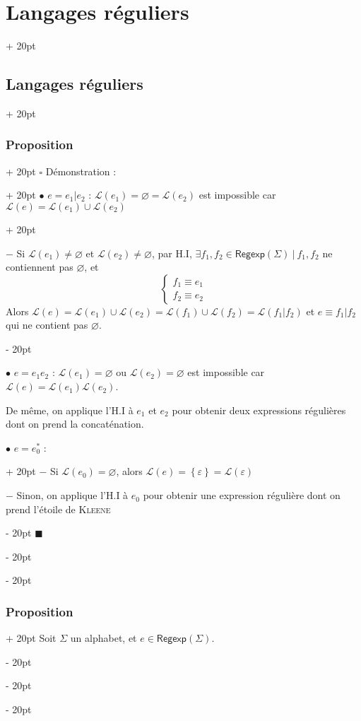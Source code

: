 \documentclass[a4paper, 12pt, twoside]{article}
\newcommand{\set}[1]{\left\{ #1 \right\}}
\newcommand{\ind}[1][20pt]{\advance\leftskip + #1}
\newcommand{\deind}[1][20pt]{\advance\leftskip - #1}
\newenvironment{indt}[2][20pt]{#2 \par \ind[#1]}{\par \deind} %
\newenvironment{proof}[1][{Démonstration :}]{\begin{indt}{$\square$ #1}}{$\blacksquare$ \end{indt}}
\newcommand{\Regexp}{\mathsf{Regexp}}
\begin{document}
\begin{indt}{\section{Langages réguliers}}
\begin{indt}{\subsection{Langages réguliers}}
\begin{indt}{\subsubsection{Proposition}}
\begin{proof}
\begin{indt}{$\bullet$ $e = e_1 | e_2$ : $\mathcal L(e_1) = \varnothing = \mathcal L(e_2)$ est impossible car $\mathcal L(e) = \mathcal L(e_1) \cup \mathcal L(e_2)$}
                        \vspace{12pt}
                        
                        $-$ Si $\mathcal L(e_1) \neq \varnothing$ et $\mathcal L(e_2) \neq \varnothing$, par H.I, $\exists f_1, f_2 \in \Regexp(\Sigma)\ |\ f_1, f_2$ ne contiennent pas $\varnothing$, et
                        \[
                            \begin{cases}
                                f_1 \equiv e_1
                                \\
                                f_2 \equiv e_2
                            \end{cases}
                        \]
                        Alors $\mathcal L(e) = \mathcal L(e_1) \cup \mathcal L(e_2) = \mathcal L(f_1) \cup \mathcal L(f_2) = \mathcal L(f_1 | f_2)$
                        et $e \equiv f_1 | f_2$ qui ne contient pas $\varnothing$.
                    \end{indt}

                    \vspace{6pt}
                    
                    $\bullet$ $e = e_1 e_2$ : $\mathcal L(e_1) = \varnothing$ ou $\mathcal L(e_2) = \varnothing$ est impossible car $\mathcal L(e) = \mathcal L(e_1) \mathcal L(e_2)$.

                    De même, on applique l'H.I à $e_1$ et $e_2$ pour obtenir deux expressions régulières dont on prend la concaténation.

                    \vspace{6pt}
                    
                    \begin{indt}{$\bullet$ $e = e_0^*$ :}
                        $-$ Si $\mathcal L(e_0) = \varnothing$, alors $\mathcal L(e) = \set \varepsilon = \mathcal L(\varepsilon)$

                        $-$ Sinon, on applique l'H.I à $e_0$ pour obtenir une expression régulière dont on prend l'étoile de \textsc{Kleene}
                    \end{indt}
                \end{proof}
            \end{indt}

            \vspace{12pt}
            
            \begin{indt}{\subsubsection{Proposition}}
                Soit $\Sigma$ un alphabet, et $e \in \Regexp(\Sigma)$.


\end{indt}
\end{indt}
\end{indt}
\end{document}
